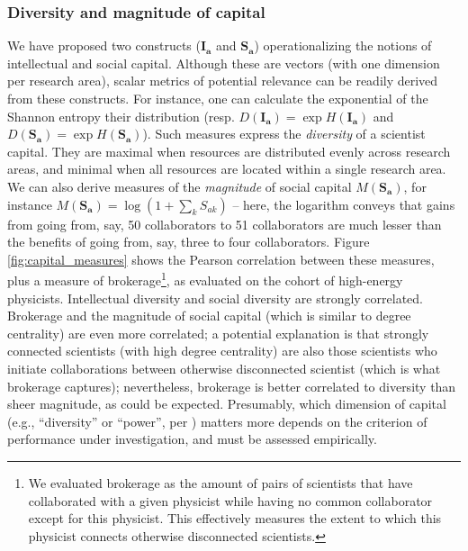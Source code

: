 \documentclass{article}
\begin{document}
\subsubsection{Diversity and magnitude of capital}

We have proposed two constructs ($\bm{I_a}$ and $\bm{S_a}$) operationalizing the notions of intellectual and social capital. Although these are vectors (with one dimension per research area), scalar metrics of potential relevance can be readily derived from these constructs. For instance, one can calculate the exponential of the Shannon entropy their distribution (resp. $D(\bm{I_a})=\exp{H(\bm{I_a})}$ and $D(\bm{S_a})=\exp{H (\bm{S_a})}$). Such measures express the \textit{diversity} of a scientist capital. They are maximal when resources are distributed evenly across research areas, and minimal when all resources are located within a single research area. We can also derive measures of the \textit{magnitude} of social capital $M(\bm{S_a})$, for instance $M(\bm{S_a})=\log{(1+\sum_k S_{ak})}$ -- here, the logarithm conveys that gains from going from, say, 50 collaborators to 51 collaborators are much lesser than the benefits of going from, say, three to four collaborators. Figure \ref{fig:capital_measures} shows the Pearson correlation between these measures, plus a measure of brokerage\footnote{We evaluated brokerage as the amount of pairs of scientists that have collaborated with a given physicist while having no common collaborator except for this physicist. This effectively measures the extent to which this physicist connects otherwise disconnected scientists.}, as evaluated on the cohort of high-energy physicists. Intellectual diversity and social diversity are strongly correlated. Brokerage and the magnitude of social capital (which is similar to degree centrality) are even more correlated; a potential explanation is that strongly connected scientists (with high degree centrality) are also those scientists who initiate collaborations between otherwise disconnected scientist (which is what brokerage captures); nevertheless, brokerage is better correlated to diversity than sheer magnitude, as could be expected. Presumably, which dimension of capital (e.g., ``diversity'' or ``power'', per \citealt{Abbasi2014}) matters more depends on the criterion of performance under investigation, and must be assessed empirically.
\end{document}
